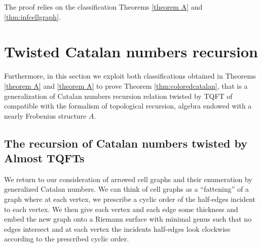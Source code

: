 \documentclass{amsart}
\theoremstyle{definition}
\begin{document}
	The proof relies on the classification Theorems \ref{theorem A} and \ref{thm:infcellgraph}.


\section{Twisted Catalan numbers recursion}\label{twisted Catalan}



\noindent Furthermore, in this section we
 exploit both classifications obtained in Theorems \ref{theorem A} and \ref{theorem A} to prove Theorem \ref{thm:coloredcatalan}, that is a generalization of Catalan numbers recursion relation twisted by TQFT of \cite{DM_invitation}  compatible with the formalism of topological recursion, algebra endowed with a nearly Frobenius structure $A$. 

















\subsection{The recursion of Catalan numbers twisted by Almost TQFTs}

\noindent We return to our consideration of arrowed cell graphs and their enumeration by generalized Catalan numbers. We can think of cell graphs as a ``fattening'' of a graph where at each vertex, we prescribe a cyclic order of the half-edges incident to each vertex. We then give each vertex and each edge some thickness and embed the new graph onto a Riemann surface with minimal genus such that no edges intersect and at each vertex the incidents half-edges look clockwise according to the prescribed cyclic order.\\
\end{document}
